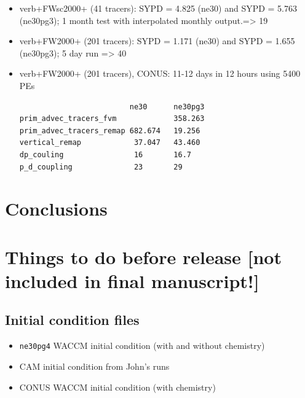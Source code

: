 \documentclass[draft]{agujournal2019}
\begin{document}
\begin{itemize}
\item verb+FWsc2000+ (41 tracers): SYPD = 4.825 (ne30) and SYPD = 5.763 (ne30pg3); 1 month test with interpolated monthly output.=> 19%
\item verb+FW2000+ (201 tracers): SYPD =  1.171 (ne30) and SYPD = 1.655 (ne30pg3); 5 day run => 40%
\item verb+FW2000+ (201 tracers), CONUS: 11-12 days in 12 hours using 5400 PEs
\begin{verbatim}
                         ne30      ne30pg3
prim_advec_tracers_fvm             358.263
prim_advec_tracers_remap 682.674   19.256
vertical_remap            37.047   43.460
dp_couling                16       16.7
p_d_coupling              23       29
\end{verbatim}


\end{itemize}
%
%
%
%

\section{Conclusions}

\section{Things to do before release [not included in final manuscript!]}
\subsection{Initial condition files}
\begin{itemize}
\item \verb+ne30pg4+ WACCM initial condition (with and without chemistry)
\item CAM initial condition from John's runs
\item CONUS WACCM initial condition (with chemistry)
\end{itemize}
\end{document}
